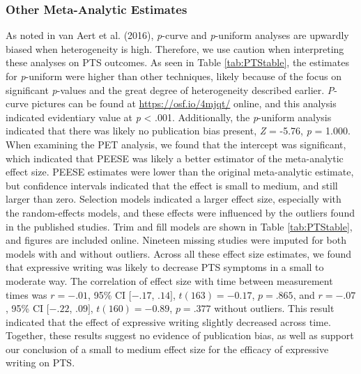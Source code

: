 \documentclass[,man]{apa6}
\begin{document}
\hypertarget{other-meta-analytic-estimates}{%
\subsubsection{Other Meta-Analytic Estimates}\label{other-meta-analytic-estimates}}

As noted in van Aert et al. (2016), \emph{p}-curve and \emph{p}-uniform analyses are upwardly biased when heterogeneity is high. Therefore, we use caution when interpreting these analyses on PTS outcomes. As seen in Table \ref{tab:PTStable}, the estimates for \emph{p}-uniform were higher than other techniques, likely because of the focus on significant \emph{p}-values and the great degree of heterogeneity described earlier. \emph{P}-curve pictures can be found at \url{https://osf.io/4mjqt/} online, and this analysis indicated evidentiary value at \emph{p} \textless{} .001. Additionally, the \emph{p}-uniform analysis indicated that there was likely no publication bias present, \emph{Z} = -5.76, \emph{p} = 1.000. When examining the PET analysis, we found that the intercept was significant, which indicated that PEESE was likely a better estimator of the meta-analytic effect size. PEESE estimates were lower than the original meta-analytic estimate, but confidence intervals indicated that the effect is small to medium, and still larger than zero. Selection models indicated a larger effect size, especially with the random-effects models, and these effects were influenced by the outliers found in the published studies. Trim and fill models are shown in Table \ref{tab:PTStable}, and figures are included online. Nineteen missing studies were imputed for both models with and without outliers. Across all these effect size estimates, we found that expressive writing was likely to decrease PTS symptoms in a small to moderate way. The correlation of effect size with time between measurement times was \(r = -.01\), 95\% CI \([-.17\), \(.14]\), \(t(163) = -0.17\), \(p = .865\), and \(r = -.07\), 95\% CI \([-.22\), \(.09]\), \(t(160) = -0.89\), \(p = .377\) without outliers. This result indicated that the effect of expressive writing slightly decreased across time. Together, these results suggest no evidence of publication bias, as well as support our conclusion of a small to medium effect size for the efficacy of expressive writing on PTS.
\end{document}
